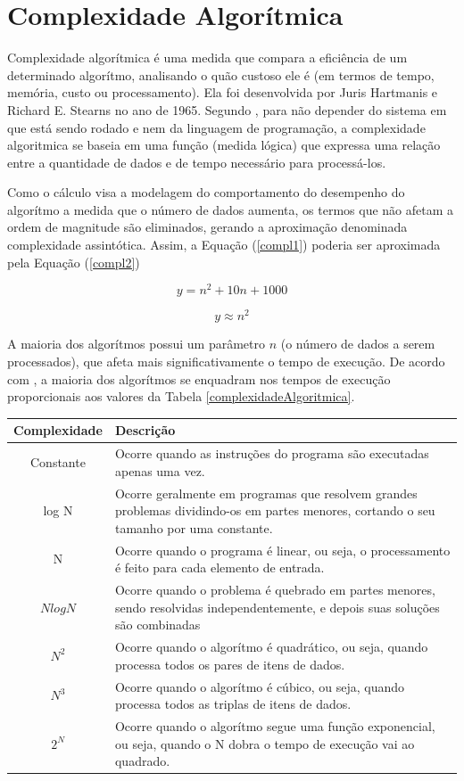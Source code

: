 {\section{Complexidade Algorítmica}

	Complexidade algorítmica é uma medida que compara a eficiência de um determinado algorítmo, analisando o quão custoso ele é (em termos de tempo, memória, custo ou processamento). Ela foi desenvolvida por Juris Hartmanis e Richard E. Stearns no ano de 1965. Segundo \cite{complexidade}, para não depender do sistema em que está sendo rodado e nem da linguagem de programação, a complexidade algoritmica se baseia em uma função (medida lógica) que expressa uma relação entre a quantidade de dados e de tempo necessário para processá-los.

	 Como o cálculo visa a modelagem do comportamento do desempenho do algorítmo a medida que o número de dados aumenta, os termos que não afetam a ordem de magnitude são eliminados, gerando a aproximação denominada complexidade assintótica. Assim, a  Equação (\ref{compl1}) poderia ser aproximada pela  Equação (\ref{compl2})

	\begin{equation}
		y = n^{2} +10 n + 1000
	\label{compl1}
	\end{equation}

	\begin{equation}
		y \approx  n^{2} 
	\label{compl2}
	\end{equation}

	A maioria dos algorítmos possui um parâmetro $n$ (o número de dados a serem processados), que afeta mais significativamente o tempo de execução. De acordo com \cite{complexidade2}, a maioria dos algorítmos se enquadram nos tempos de execução proporcionais aos valores da Tabela \ref{complexidadeAlgoritmica}.

\begin{table}[h]
	\centering	
	\begin{tabularx}{0.9\textwidth}{cX}
		\toprule
		\textbf{Complexidade} & \textbf{Descrição}  \\
		\midrule
		Constante &  Ocorre quando as instruções do programa são executadas apenas uma vez.\\
		log N & Ocorre geralmente em programas que resolvem grandes problemas dividindo-os em partes menores, cortando o seu tamanho por uma constante.  \\
		N & Ocorre quando o programa é linear, ou seja, o  processamento é feito para cada elemento de entrada. \\
		$ N log N$ & Ocorre quando o problema é quebrado em partes menores, sendo resolvidas independentemente, e depois suas soluções são combinadas \\
		$ N^{2}$ & Ocorre quando o algorítmo é quadrático, ou seja, quando processa todos os pares de itens de dados. \\
		$ N^{3}$ & Ocorre quando o algorítmo é cúbico, ou seja, quando processa todos as triplas de itens de dados. \\
		$ 2^{N}$ & Ocorre quando o algorítmo segue uma função exponencial, ou seja, quando o N dobra o tempo de execução vai ao quadrado. \\
	

\end{tabularx}
\end{table}}
